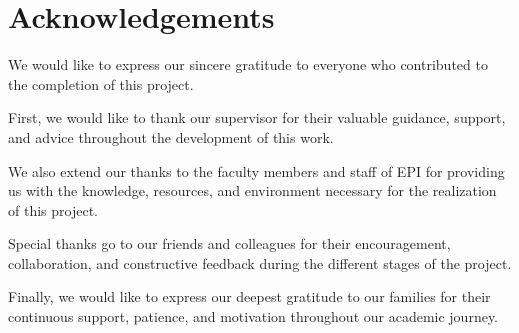 \chapter*{Acknowledgements}
{}

We would like to express our sincere gratitude to everyone who contributed to the completion of this project.

First, we would like to thank our supervisor for their valuable guidance, support, and advice throughout the development of this work.

We also extend our thanks to the faculty members and staff of EPI for providing us with the knowledge, resources, and environment necessary for the realization of this project.

Special thanks go to our friends and colleagues for their encouragement, collaboration, and constructive feedback during the different stages of the project.

Finally, we would like to express our deepest gratitude to our families for their continuous support, patience, and motivation throughout our academic journey.